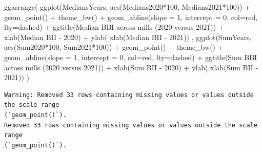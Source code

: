 \documentclass[
  letterpaper,
  DIV=11,
  numbers=noendperiod]{scrartcl}
\newenvironment{Shaded}{\begin{snugshade}}{\end{snugshade}}
\newcommand{\AttributeTok}[1]{\textcolor[rgb]{0.40,0.45,0.13}{#1}}
\newcommand{\DecValTok}[1]{\textcolor[rgb]{0.68,0.00,0.00}{#1}}
\newcommand{\FunctionTok}[1]{\textcolor[rgb]{0.28,0.35,0.67}{#1}}
\newcommand{\NormalTok}[1]{\textcolor[rgb]{0.00,0.23,0.31}{#1}}
\newcommand{\SpecialCharTok}[1]{\textcolor[rgb]{0.37,0.37,0.37}{#1}}
\newcommand{\StringTok}[1]{\textcolor[rgb]{0.13,0.47,0.30}{#1}}
\begin{document}
\begin{Shaded}
\begin{Highlighting}[]
\FunctionTok{ggarrange}\NormalTok{(}
\FunctionTok{ggplot}\NormalTok{(MediansYears, }\FunctionTok{aes}\NormalTok{(Medians2020}\SpecialCharTok{*}\DecValTok{100}\NormalTok{, Medians2021}\SpecialCharTok{*}\DecValTok{100}\NormalTok{)) }\SpecialCharTok{+} 
  \FunctionTok{geom\_point}\NormalTok{() }\SpecialCharTok{+} 
  \FunctionTok{theme\_bw}\NormalTok{() }\SpecialCharTok{+} 
  \FunctionTok{geom\_abline}\NormalTok{(}\AttributeTok{slope =} \DecValTok{1}\NormalTok{, }\AttributeTok{intercept =} \DecValTok{0}\NormalTok{, }\AttributeTok{col=}\StringTok{\textquotesingle{}red\textquotesingle{}}\NormalTok{, }\AttributeTok{lty=}\StringTok{\textquotesingle{}dashed\textquotesingle{}}\NormalTok{) }\SpecialCharTok{+}
\FunctionTok{ggtitle}\NormalTok{(}\StringTok{\textquotesingle{}Median BBI across mills (2020 versus 2021)\textquotesingle{}}\NormalTok{)  }\SpecialCharTok{+}
  \FunctionTok{xlab}\NormalTok{(}\StringTok{\textquotesingle{}Median BII {-} 2020\textquotesingle{}}\NormalTok{) }\SpecialCharTok{+} \FunctionTok{ylab}\NormalTok{( }\FunctionTok{xlab}\NormalTok{(}\StringTok{\textquotesingle{}Median BII {-} 2021\textquotesingle{}}\NormalTok{))}
\NormalTok{,}
\FunctionTok{ggplot}\NormalTok{(SumYears, }\FunctionTok{aes}\NormalTok{(Sum2020}\SpecialCharTok{*}\DecValTok{100}\NormalTok{, Sum2021}\SpecialCharTok{*}\DecValTok{100}\NormalTok{)) }\SpecialCharTok{+} 
  \FunctionTok{geom\_point}\NormalTok{() }\SpecialCharTok{+} 
  \FunctionTok{theme\_bw}\NormalTok{() }\SpecialCharTok{+} 
  \FunctionTok{geom\_abline}\NormalTok{(}\AttributeTok{slope =} \DecValTok{1}\NormalTok{, }\AttributeTok{intercept =} \DecValTok{0}\NormalTok{, }\AttributeTok{col=}\StringTok{\textquotesingle{}red\textquotesingle{}}\NormalTok{, }\AttributeTok{lty=}\StringTok{\textquotesingle{}dashed\textquotesingle{}}\NormalTok{) }\SpecialCharTok{+}
\FunctionTok{ggtitle}\NormalTok{(}\StringTok{\textquotesingle{}Sum BBI across mills (2020 versus 2021)\textquotesingle{}}\NormalTok{)  }\SpecialCharTok{+}
  \FunctionTok{xlab}\NormalTok{(}\StringTok{\textquotesingle{}Sum BII {-} 2020\textquotesingle{}}\NormalTok{) }\SpecialCharTok{+} \FunctionTok{ylab}\NormalTok{( }\FunctionTok{xlab}\NormalTok{(}\StringTok{\textquotesingle{}Sum BII {-} 2021\textquotesingle{}}\NormalTok{))}
\NormalTok{)}
\end{Highlighting}
\end{Shaded}

\begin{verbatim}
Warning: Removed 33 rows containing missing values or values outside the scale range
(`geom_point()`).
Removed 33 rows containing missing values or values outside the scale range
(`geom_point()`).
\end{verbatim}
\end{document}
